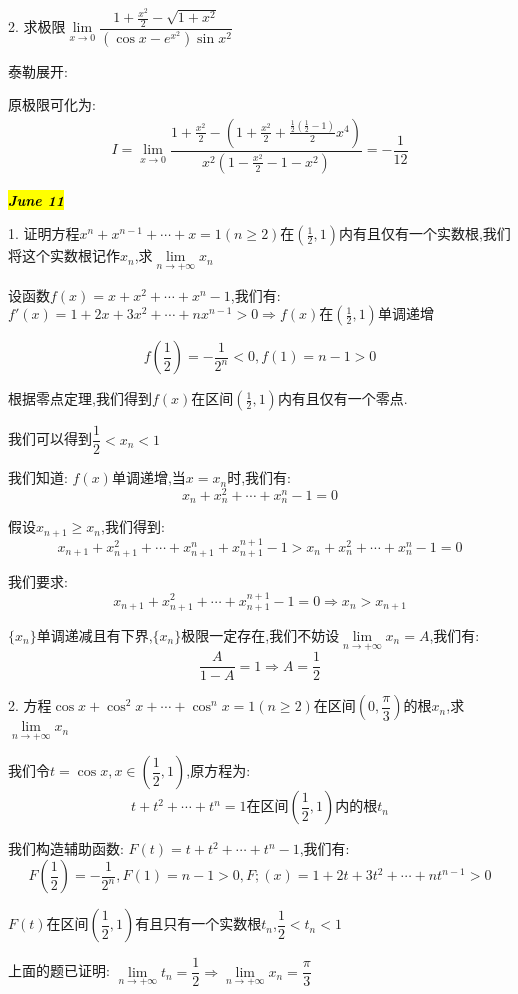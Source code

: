 2. 求极限$\lim\limits_{x\rightarrow 0}\dfrac{1+\frac{x^2}{2}-\sqrt{1+x^2}}{(\cos x-e^{x^2})\sin x^2}$
\begin{solution}
	
	泰勒展开: 
	
	原极限可化为: 
	\begin{eqnarray*}
		I=\lim\limits_{x\rightarrow 0}\dfrac{1+\frac{x^2}{2}-(1+\frac{x^2}{2}+\frac{\frac{1}{2}(\frac{1}{2}-1)}{2}x^4)}{x^2(1-\frac{x^2}{2}-1-x^2)}=-\dfrac{1}{12}
	\end{eqnarray*}
\end{solution}

\hl{\textbf{\textit{June 11}}}

1. 证明方程$x^n+x^{n-1}+\cdots+x=1(n\geq 2)$在$(\frac{1}{2},1)$内有且仅有一个实数根,我们将这个实数根记作$x_{n}$,求$\lim\limits_{n\rightarrow+\infty}x_{n}$
\begin{solution}
	
	设函数$f(x)=x+x^2+\cdots+x^n-1$,我们有: $f'(x)=1+2x+3x^2+\cdots+nx^{n-1}>0\Rightarrow f(x)\text{在}(\frac{1}{2},1)\text{单调递增}$
	
	$$f(\frac{1}{2})=-\frac{1}{2^n}<0, f(1)=n-1>0$$
	
	根据零点定理,我们得到$f(x)$在区间$(\frac{1}{2},1)$内有且仅有一个零点.
	
	我们可以得到$\dfrac{1}{2}<x_{n}<1$
	
	我们知道: $f(x)$单调递增,当$x=x_{n}$时,我们有: 
	$$x_{n}+x_{n}^2+\cdots+x_{n}^n-1=0$$
	
	假设$x_{n+1}\geq x_{n}$,我们得到: 
	$$x_{n+1}+x_{n+1}^2+\cdots+x_{n+1}^n+x_{n+1}^{n+1}-1>x_{n}+x_{n}^2+\cdots+x_{n}^n-1=0$$
	
	我们要求: 
	$$x_{n+1}+x_{n+1}^2+\cdots+x_{n+1}^{n+1}-1=0\Rightarrow x_{n}>x_{n+1}$$
	
	$\{x_{n}\}$单调递减且有下界,$\{x_{n}\}$极限一定存在,我们不妨设$\lim\limits_{n\rightarrow +\infty}x_{n}=A$,我们有: 
	$$\dfrac{A}{1-A}=1\Rightarrow A=\dfrac{1}{2}$$
	
\end{solution}

2. 方程$\cos x+\cos^2 x+\cdots+\cos^n x=1(n\geq 2)$在区间$(0,\dfrac{\pi}{3})$的根$x_{n}$,求$\lim\limits_{n\rightarrow+\infty}x_{n}$
\begin{solution}
	
	我们令$t=\cos x,x\in(\dfrac{1}{2},1)$,原方程为: 
	$$t+t^2+\cdots+t^{n}=1\text{在区间}(\dfrac{1}{2},1)\text{内的根}t_{n}$$
	
	我们构造辅助函数: $F(t)=t+t^2+\cdots+t^{n}-1$,我们有: 
	$$F(\dfrac{1}{2})=-\dfrac{1}{2^n},F(1)=n-1>0,F;(x)=1+2t+3t^2+\cdots+nt^{n-1}>0$$
	
	$F(t)$在区间$(\dfrac{1}{2},1)$有且只有一个实数根$t_{n}$,$\dfrac{1}{2}<t_{n}<1$
	
	上面的题已证明: $\lim\limits_{n\rightarrow+\infty}t_{n}=\dfrac{1}{2}\Rightarrow\lim\limits_{n\rightarrow+\infty}x_{n}=\dfrac{\pi}{3}$
\end{solution}

